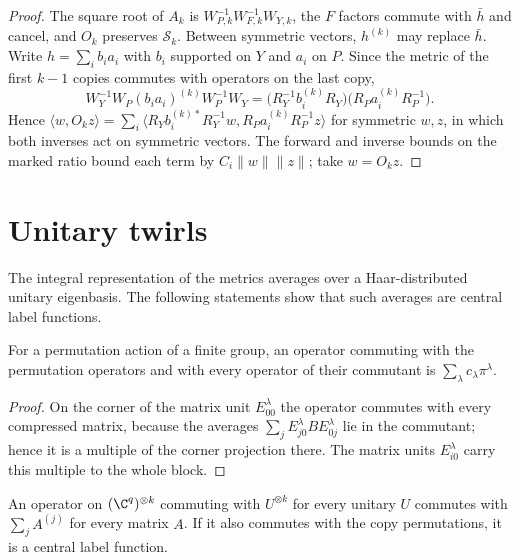 \begin{proof}\leanok
    The square root of $A_k$ is $W_{P,k}^{-1}W_{F,k}^{-1}W_{Y,k}$, the $F$ factors
    commute with $\bar h$ and cancel, and $O_k$ preserves $\mathcal S_k$. Between
    symmetric vectors, $h^{(k)}$ may replace $\bar h$. Write $h=\sum_ib_ia_i$ with $b_i$
    supported on $Y$ and $a_i$ on $P$. Since the metric of the first $k-1$ copies
    commutes with operators on the last copy,
    \[
        W_Y^{-1}W_P(b_ia_i)^{(k)}W_P^{-1}W_Y
        =\bigl(R_Y^{-1}b_i^{(k)}R_Y\bigr)\bigl(R_Pa_i^{(k)}R_P^{-1}\bigr).
    \]
    Hence $\langle w,O_kz\rangle=\sum_i\langle R_Yb_i^{(k)\ast}R_Y^{-1}w,
    R_Pa_i^{(k)}R_P^{-1}z\rangle$ for symmetric $w,z$, in which both inverses act on
    symmetric vectors. The forward and inverse bounds on the marked ratio bound each
    term by $C_i\|w\|\|z\|$; take $w=O_kz$.
\end{proof}

\section{Unitary twirls}

The integral representation of the metrics averages over a Haar-distributed unitary
eigenbasis. The following statements show that such averages are central label functions.

\begin{lemma}
    \label{lem:central_label_function}
    \leanok
    For a permutation action of a finite group, an operator commuting with the
    permutation operators and with every operator of their commutant is
    $\sum_\lambda c_\lambda\pi^\lambda$.
\end{lemma}

\begin{proof}\leanok
    On the corner of the matrix unit $E^\lambda_{00}$ the operator commutes with every
    compressed matrix, because the averages $\sum_jE^\lambda_{j0}BE^\lambda_{0j}$ lie in
    the commutant; hence it is a multiple of the corner projection there. The matrix
    units $E^\lambda_{i0}$ carry this multiple to the whole block.
\end{proof}

\begin{lemma}
    \label{lem:unitary_commutant}
    \leanok
    An operator on $(\C^q)^{\otimes k}$ commuting with $U^{\otimes k}$ for every unitary
    $U$ commutes with $\sum_jA^{(j)}$ for every matrix $A$. If it also commutes with the
    copy permutations, it is a central label function.
\end{lemma}


